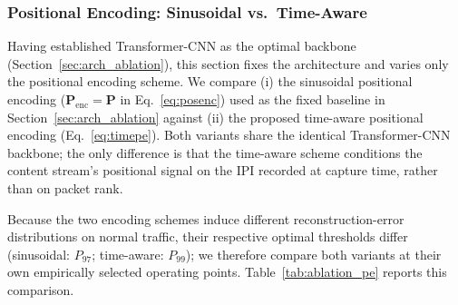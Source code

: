 \subsubsection{Positional Encoding: Sinusoidal vs.\ Time-Aware}
\label{sec:pe_ablation}
Having established Transformer-CNN as the optimal backbone (Section~\ref{sec:arch_ablation}), this section fixes the architecture and varies only the positional encoding scheme. We compare (i) the sinusoidal positional encoding ($\mathbf{P}_{\text{enc}} = \mathbf{P}$ in Eq.~\eqref{eq:posenc}) used as the fixed baseline in Section~\ref{sec:arch_ablation} against (ii) the proposed time-aware positional encoding (Eq.~\eqref{eq:timepe}). Both variants share the identical Transformer-CNN backbone; the only difference is that the time-aware scheme conditions the content stream's positional signal on the IPI recorded at capture time, rather than on packet rank.

Because the two encoding schemes induce different reconstruction-error distributions on normal traffic, their respective optimal thresholds differ (sinusoidal: $P_{97}$; time-aware: $P_{99}$); we therefore compare both variants at their own empirically selected operating points. Table~\ref{tab:ablation_pe} reports this comparison.

\begin{table}[!htbp]
\centering
\caption{Ablation study: Comparing the conventional sinusoidal positional encoding (baseline) against the proposed time-aware positional encoding, on the fixed Transformer-CNN backbone. Each variant is read at its own best-overall-F1 threshold, selected on the evaluation files, so these are per-variant optima rather than unbiased estimates (Table~\ref{tab:ablation_pe_cat} is threshold-independent). Overall F1: micro-avg (all 27 files); RTP/Nmap F1: macro-avg within category.}
\label{tab:ablation_pe}
\small
{}
\end{table}

